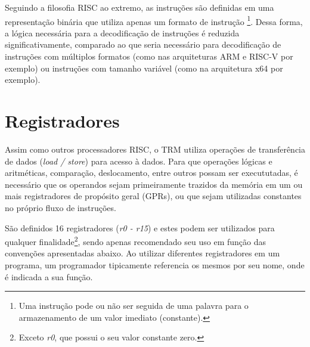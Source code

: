 \documentclass[11pt,a4paper]{report}
\begin{document}
Seguindo a filosofia RISC ao extremo, as instruções são definidas em uma
representação binária que utiliza apenas um formato de instrução
\footnote{Uma instrução pode ou não ser seguida de uma palavra para o
armazenamento de um valor imediato (constante).}. Dessa forma, a lógica
necessária para a decodificação de instruções é reduzida significativamente,
comparado ao que seria necessário para decodificação de instruções com
múltiplos formatos (como nas arquiteturas ARM e RISC-V por exemplo) ou
instruções com tamanho variável (como na arquitetura x64 por exemplo).

\section{Registradores}

Assim como outros processadores RISC, o TRM utiliza operações de
transferência de dados (\textit{load / store}) para acesso à dados. Para
que operações lógicas e aritméticas, comparação, deslocamento, entre
outros possam ser execututadas, é necessário que os operandos sejam 
primeiramente trazidos da memória em um ou mais registradores de
propósito geral (GPRs), ou que sejam utilizadas constantes no próprio
fluxo de instruções.

São definidos 16 registradores (\textit{r0 - r15}) e estes podem ser
utilizados para qualquer finalidade\footnote{Exceto \textit{r0}, que
possui o seu valor constante zero.}, sendo apenas recomendado seu uso em
função das convenções apresentadas abaixo. Ao utilizar diferentes
registradores em um programa, um programador tipicamente referencia os
mesmos por seu nome, onde é indicada a sua função.
\end{document}
